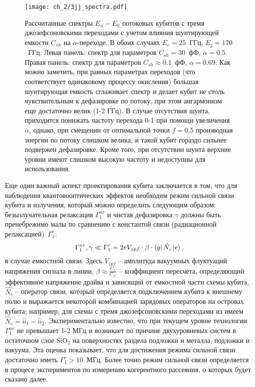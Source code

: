 \begin{figure}[htb]\center
	\texttt{[image: ch\_2/3jj\_spectra.pdf]} \hfill
	\caption[width=0.8\textwidth]{Рассчитанные спектры $E_n-E_0$ потоковых кубитов с тремя джозефсоновскими переходами с учетом влияния шунтирующей емкости $C_{sh}$ на $\alpha$-переходе. В обоих случаях $E_c = 25$~ГГц, $E_j=170$~ГГц. Левая панель: спектр для параметров $C_{sh} = 30$~фФ, $\alpha=0.5$. Правая панель: спектр для параметров $C_{sh} \approx 0.1$~фФ, $\alpha=0.69$. Как можно заметить, при равных параметрах переходов (что соответствует одинаковому процессу окисления) большая шунтирующая емкость сглаживает спектр и делает кубит не столь чувствительным к дефазировке по потоку, при этом ангармонизм еще достаточно велик (1-2 ГГц). В случае отсутствия шунта, приходится понижать частоту перехода 0-1 при помощи увеличения $\alpha$, однако, при смещении от оптимальной точки $f=0.5$ производная энергии по потоку слишком велика, и такой кубит гораздо сильнее подвержен дефазировке. Кроме того, при отсутствии шунта верхние уровни имеют слишком высокую частоту и недоступны для использования.}
	\label{fig: 3jj_spectra}
\end{figure}

Еще один важный аспект проектирования кубита заключается в том, что для наблюдения квантовооптических эффектов необходим режим сильной связи кубита и излучения, который можно определить следующим образом: безызлучательная релаксация $\Gamma_1^{nr}$ и чистая дефазировка $\gamma$ должны быть пренебрежимо малы по сравнению с константой связи (радиационной релаксацией)~$\Gamma^r_1$:
\begin{equation}
\Gamma^{nr}_1,\gamma \ll 
\Gamma_1^r = 2eV_{zpf}\cdot\beta\cdot\bra{g}\hat{N}_c \ket{e},
\label{eq:strong_c}
\end{equation} 
в случае емкостной связи. Здесь $V_{zpf}$ -- амплитуда вакуумных флуктуаций напряжения сигнала в линии, $\beta\approx \frac{C_c}{C_{\Sigma}}$ -- коэффициент пересчета, определяющий эффективное напряжение драйва и зависящий от емкостной части схемы кубита, $\hat{N_c}$ -- оператор связи, который определяется подключением кубита к внешнему полю и выражается некоторой комбинацией зарядовых операторов на островах кубита; например, для схемы с тремя джозефсоновскими переходами из \cite{yan2016flux} имеем $\hat{N}_c = \hat{n}_1 - \hat{n}_2$. Экспериментально известно, что при текущем уровне технологии $\Gamma_1^{nr}$ не превышает 1-2 МГц и возникает по причине двухуровневых систем в остаточном слое SiO$_2$ на поверхностях раздела подложки и металла, подложки и вакуума. Эта оценка показывает, что для достижения режима сильной связи достаточно иметь $\Gamma_1^r > 10$~МГц. Более точно режим сильной связи определяется в процесе экспериментов по измерению когерентного рассеяния, о которых будет сказано далее. 


